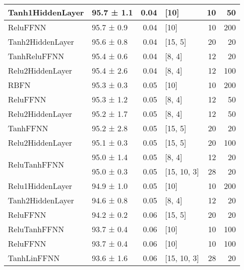 \begin{longtable}{llrlrr}
 \hline
Tanh1HiddenLayer                    & 95.7 ± 1.1  &  0.04 & [10]           &         10 &       50 \\
 \hline
ReluFFNN                            & 95.7 ± 0.9  &  0.04 & [10]           &         10 &      200 \\
 \hline
Tanh2HiddenLayer                    & 95.6 ± 0.8  &  0.04 & [15, 5]        &         20 &       20 \\
 \hline
TanhReluFFNN                        & 95.4 ± 0.6  &  0.04 & [8, 4]         &         12 &       20 \\
 \hline
Relu2HiddenLayer                    & 95.4 ± 2.6  &  0.04 & [8, 4]         &         12 &      100 \\
 \hline
RBFN                                & 95.3 ± 0.3  &  0.05 & [10]           &         10 &      200 \\
 \hline
ReluFFNN                            & 95.3 ± 1.2  &  0.05 & [8, 4]         &         12 &       50 \\
 \hline
Relu2HiddenLayer                    & 95.2 ± 1.7  &  0.05 & [8, 4]         &         12 &       50 \\
 \hline
TanhFFNN                            & 95.2 ± 2.8  &  0.05 & [15, 5]        &         20 &       20 \\
 \hline
Relu2HiddenLayer                    & 95.1 ± 0.3  &  0.05 & [15, 5]        &         20 &      100 \\
 \hline
\multirow{2}{*}{ReluTanhFFNN}       & 95.0 ± 1.4  &  0.05 & [8, 4]         &         12 &       20 \\
                                            & 95.0 ± 0.3  &  0.05 & [15, 10, 3]    &         28 &       20 \\
 \hline
Relu1HiddenLayer                    & 94.9 ± 1.0  &  0.05 & [10]           &         10 &      200 \\
 \hline
Tanh2HiddenLayer                    & 94.6 ± 0.8  &  0.05 & [8, 4]         &         12 &       20 \\
 \hline
ReluFFNN                            & 94.2 ± 0.2  &  0.06 & [15, 5]        &         20 &       20 \\
 \hline
ReluTanhFFNN                        & 93.7 ± 0.4  &  0.06 & [10]           &         10 &      100 \\
 \hline
ReluFFNN                            & 93.7 ± 0.4  &  0.06 & [10]           &         10 &      100 \\
 \hline
TanhLinFFNN                         & 93.6 ± 1.6  &  0.06 & [15, 10, 3]    &         28 &       20 \\

\end{longtable}
